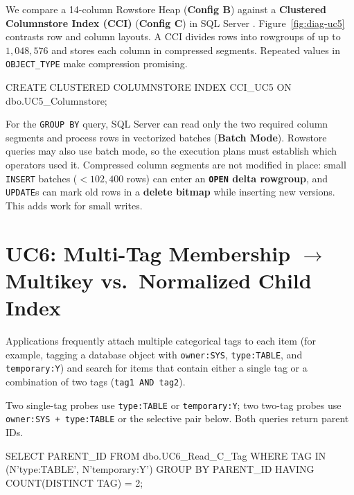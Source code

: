 We compare a 14-column Rowstore Heap (\textbf{Config B}) against a \textbf{Clustered Columnstore Index (CCI)} (\textbf{Config C}) in SQL Server \cite{mssqlcci}. Figure~\ref{fig:diag-uc5} contrasts row and column layouts. A CCI divides rows into rowgroups of up to $1,048,576$ and stores each column in compressed segments. Repeated values in \texttt{OBJECT\_TYPE} make compression promising.

\begin{SQLCode}
CREATE CLUSTERED COLUMNSTORE INDEX CCI_UC5
ON dbo.UC5_Columnstore;
\end{SQLCode}

For the \texttt{GROUP BY} query, SQL Server can read only the two required column segments and process rows in vectorized batches (\textbf{Batch Mode}). Rowstore queries may also use batch mode, so the execution plans must establish which operators used it. 
Compressed column segments are not modified in place: small \texttt{INSERT} batches ($<102,400$ rows) can enter an \textbf{\texttt{OPEN} delta rowgroup}, and \texttt{UPDATE}s can mark old rows in a \textbf{delete bitmap} while inserting new versions. This adds work for small writes.

\UCFiveDiagram

\section{UC6: Multi-Tag Membership \texorpdfstring{$\rightarrow$}{->} Multikey vs.\ Normalized Child Index}

Applications frequently attach multiple categorical tags to each item (for example, tagging a database object with \texttt{owner:SYS}, \texttt{type:TABLE}, and \texttt{temporary:Y}) and search for items that contain either a single tag or a combination of two tags (\texttt{tag1 AND tag2}).

Two single-tag probes use \texttt{type:TABLE} or \texttt{temporary:Y}; two two-tag probes use \texttt{owner:SYS + type:TABLE} or the selective pair below. Both queries return parent IDs.
\begin{SQLCode}
SELECT PARENT_ID FROM dbo.UC6_Read_C_Tag
WHERE TAG IN (N'type:TABLE', N'temporary:Y')
GROUP BY PARENT_ID HAVING COUNT(DISTINCT TAG) = 2;
\end{SQLCode}

